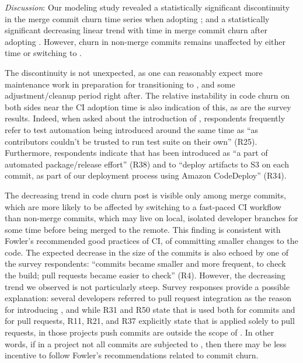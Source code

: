 

\smallskip\noindent \emph{Discussion}:
Our modeling study revealed a statistically significant discontinuity
in the merge commit churn time series when adopting \Tvis; and a statistically 
significant decreasing linear trend with time in merge commit churn after adopting \Tvis.
However, churn in non-merge commits remains unaffected by either time or 
switching to \Tvis.

The discontinuity is not unexpected, as one can reasonably expect more 
maintenance work in preparation for transitioning to \Tvis, 
and some adjustment/cleanup period right after.
The relative instability in code churn on both sides near the CI adoption time is 
also indication of this, as are the survey results.  
Indeed, when asked about the introduction of \Tvis, respondents frequently refer 
to test automation being introduced around the same time as \Tvi ``as contributors 
couldn't be trusted to run test suite on their own'' (R25). Furthermore, respondents 
indicate that \Tvi has been introduced as ``a part of automated package/release 
effort'' (R38) and to ``deploy artifacts to S3 on each commit, as part of our 
deployment process using Amazon CodeDeploy'' (R34).

The decreasing trend in code churn post \Tvi is visible only among merge commits,
which are more likely to be affected by switching to a fast-paced CI workflow than
non-merge commits, which may live on local, isolated developer branches for
some time before being merged to the remote.
This finding is consistent with Fowler's recommended good practices of CI, of 
committing smaller changes to the code.
The expected decrease in the size of the commits is also echoed by one of the 
survey respondents: ``commits became smaller and more frequent, to check 
the build; pull requests became easier to check'' (R4).
However, the decreasing trend we observed is not particularly steep.
Survey responses provide a possible explanation: several developers 
referred to pull request integration as the reason for introducing \Tvis, and 
while R31 and R50 state that \Tvis is used both for commits and for pull 
requests, R11, R21, and R37 explicitly state that \Tvis is applied solely to 
pull requests, \ie in those projects push commits are outside the scope of \Tvis.
In other words, if in a project not all commits are subjected to \Tvis, then 
there may be less incentive to follow Fowler's recommendations 
related to commit churn.

